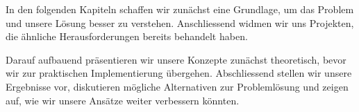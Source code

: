 In den folgenden Kapiteln schaffen wir zunächst eine Grundlage, um das Problem und unsere Lösung besser zu verstehen. Anschliessend 
widmen wir uns Projekten, die ähnliche Herausforderungen bereits behandelt haben.

Darauf aufbauend präsentieren wir unsere Konzepte zunächst theoretisch, bevor wir zur praktischen Implementierung 
übergehen. Abschliessend stellen wir unsere Ergebnisse vor, diskutieren mögliche Alternativen zur Problemlösung und 
zeigen auf, wie wir unsere Ansätze weiter verbessern könnten.


